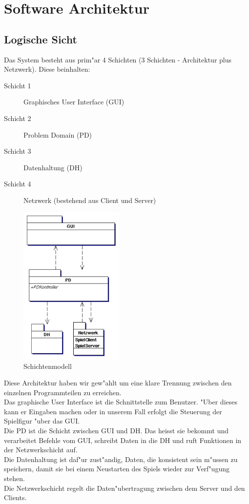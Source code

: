 \chapter{Software Architektur}

\section{Logische Sicht}
Das System besteht aus prim"ar 4 Schichten (3  Schichten - Architektur plus Netzwerk). Diese beinhalten:
\begin{description}
\item[Schicht 1] Graphisches User Interface (GUI)
\item[Schicht 2] Problem Domain (PD)
\item[Schicht 3] Datenhaltung (DH)
\item[Schicht 4] Netzwerk (bestehend aus Client und Server)
\end{description}

\begin{figure}[H]
  \begin{center}
    \includegraphics[height=8cm]{./images/architektur.pdf}
  \end{center}
  \caption{Schichtenmodell}
\end{figure}

Diese Architektur haben wir gew"ahlt um eine klare Trennung zwischen den einzelnen Programmteilen zu erreichen. \\
Das graphische User Interface ist die Schnittstelle zum Benutzer. "Uber dieses kann er Eingaben machen oder in unserem Fall erfolgt die Steuerung
der Spielfigur "uber das GUI. \\
Die PD ist die Schicht zwischen GUI und DH. Das heisst sie bekommt und verarbeitet Befehle vom GUI, schreibt Daten in die DH und
ruft Funktionen in der Netzwerkschicht auf. \\
Die Datenhaltung ist daf"ur zust"andig, Daten, die konsistent sein m"ussen zu speichern, damit sie bei einem Neustarten des Spiels wieder
zur Verf"ugung stehen. \\
Die Netzwerkschicht regelt die Daten"ubertragung zwischen dem Server und den Clients.




